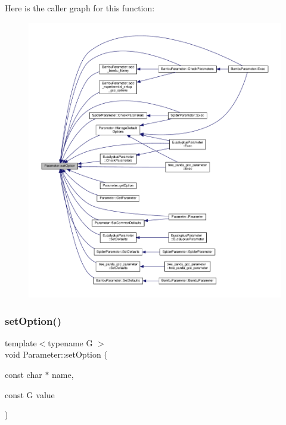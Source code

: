 Here is the caller graph for this function\+:
\nopagebreak
\begin{figure}[H]
\begin{center}
\leavevmode
\includegraphics[width=350pt]{dc/dab/classParameter_ad5762d08597d6c2fe175efe23d66b148_icgraph}
\end{center}
\end{figure}
\mbox{\label{classParameter_a36852149cf3f530d2e844d57188413a4}} 
\subsubsection{\texorpdfstring{set\+Option()}{setOption()}\hspace{0.1cm}{\footnotesize\ttfamily [2/3]}}
{\footnotesize\ttfamily template$<$typename G $>$ \\
void Parameter\+::set\+Option (\begin{DoxyParamCaption}\item[{const char $\ast$}]{name,  }\item[{const G}]{value }\end{DoxyParamCaption})\hspace{0.3cm}{\ttfamily [inline]}}



